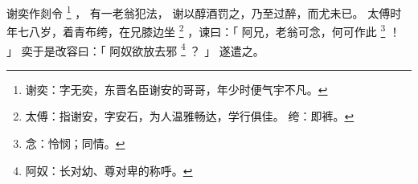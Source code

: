 
\switchcolumn*[\section{}]

谢奕作剡令%
\footnote{%
    谢奕：字无奕，东晋名臣谢安的哥哥，年少时便气宇不凡。
}%
，
有一老翁犯法，
谢以醇酒罚之，乃至过醉，而尤未已。
太傅时年七八岁，着青布绔，在兄膝边坐%
\footnote{%
    太傅：指谢安，字安石，为人温雅畅达，学行俱佳。
    绔：即裤。
}%
，谏曰：「
    阿兄，老翁可念，何可作此%
    \footnote{%
        念：怜悯；同情。
    }%
    ！
」
奕于是改容曰：「
    阿奴欲放去邪%
    \footnote{%
        阿奴：长对幼、尊对卑的称呼。
    }%
    ？
」
遂遣之。

\switchcolumn



